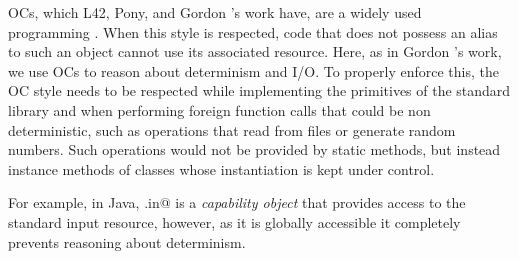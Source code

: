 


OCs, which L42, Pony, and Gordon \etal's work have, are a widely used~\cite{miller2003capability,
noble2016abstract,karger1988improving} programming  . When this style
is respected, code that does not possess an alias to such an object cannot use its associated resource.
Here, as in Gordon \etal's work, we use OCs to reason about determinism and I/O. To properly enforce this, the OC style needs to be respected while implementing the primitives of the standard library\IO{,} and when performing foreign function calls that could be non deterministic, such as operations that read from files or generate random numbers. Such operations would not be provided by static methods, but instead instance methods of classes whose instantiation is kept under control. 




\lstset{language=Java}
 For example, in Java, \Q@System.in@
 \lstset{language=FortyTwo} 
  is a \emph{capability object} that provides access to the standard input resource, however, as it is globally accessible it completely prevents reasoning about determinism. 

